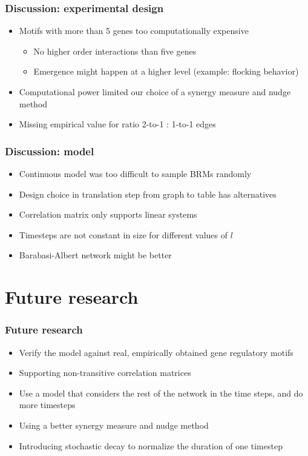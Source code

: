 \documentclass[hyperref={pdfpagelabels=false}]{beamer}
\begin{document}
\begin{frame}
\frametitle{Discussion: experimental design}
\begin{itemize}
\item Motifs with more than 5 genes too computationally expensive
\begin{itemize}
\item No higher order interactions than five genes
\item Emergence might happen at a higher level (example: flocking behavior)
\end{itemize}
\item Computational power limited our choice of a synergy measure and nudge method
\item Missing empirical value for ratio 2-to-1 : 1-to-1 edges
\end{itemize}
\end{frame}

\begin{frame}
\frametitle{Discussion: model}
\begin{itemize}
\item Continuous model was too difficult to sample BRMs randomly
\item Design choice in translation step from graph to table has alternatives
\item Correlation matrix only supports linear systems
\item Timesteps are not constant in size for different values of $l$
\item Barabasi-Albert network might be better
\end{itemize}
\end{frame}

\section{Future research}
\setcounter{subsection}{1}

\begin{frame}
\frametitle{Future research}
\begin{itemize}
\item Verify the model against real, empirically
obtained gene regulatory motifs
\item Supporting non-transitive correlation matrices
\item Use a model that considers the rest of the network in the time steps, and do more timesteps
\item Using a better synergy measure and nudge method
\item Introducing stochastic decay to normalize the duration of one timestep
\end{itemize}
\end{frame}
\end{document}
